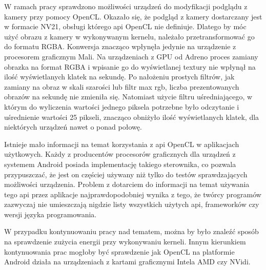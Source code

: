 W ramach pracy sprawdzono możliwości urządzeń do modyfikacji podglądu z kamery przy pomocy OpenCL. Okazało się, że podgląd z kamery dostarczany jest w formacie NV21, obsługi którego api OpenCL nie definiuje. Dlatego by móc użyć obrazu z kamery w wykonywanym kernelu, należało przetransformować go do formatu RGBA. Konwersja znacząco wpłynęła jedynie na urządzenie z procesorem graficznym Mali. Na urządzeniach z GPU od Adreno proces zamiany obrazka na format RGBA i wpisanie go do wyświetlanej textury nie wpłynął na ilość wyświetlanych klatek na sekundę. Po nałożeniu prostych filtrów, jak zamiany na obraz w skali szarości lub filtr max rgb, liczba prezentowanych obrazów na sekundę nie zmieniła się. Natomiast użycie filtru uśredniającego, w którym do wyliczenia wartości jednego piksela potrzebne było odczytanie i uśrednienie wartości 25 pikseli, znacząco obniżyło ilość wyświetlanych klatek, dla niektórych urządzeń nawet o ponad połowę.

Istnieje mało informacji na temat korzystania z api OpenCL w aplikacjach użytkowych. Każdy z producentów procesorów graficznych dla urządzeń z systemem Android posiada implementację takiego sterownika, co pozwala przypuszczać, że jest on częściej używany niż tylko do testów sprawdzających możliwości urządzenia. Problem z dotarciem do informacji na temat używania tego api przez aplikacje najprawdopodobniej wynika z tego, że twórcy programów zazwyczaj nie umieszczają nigdzie listy wszystkich użytych api, frameworków czy wersji języka programowania.

W przypadku kontynuowaniu pracy nad tematem, można by było znaleźć sposób na sprawdzenie zużycia energii przy wykonywaniu kerneli. Innym kierunkiem kontynuowania prac mogłoby być sprawdzenie jak OpenCL na platformie Android działa na urządzeniach z kartami graficznymi Intela AMD czy NVidi.
